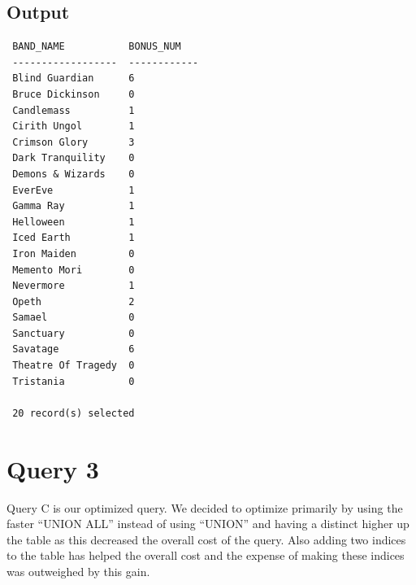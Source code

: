 \documentclass{report}
\begin{document}
\subsection*{Output}
\begin{verbatim}
 BAND_NAME           BONUS_NUM    
 ------------------  ------------ 
 Blind Guardian      6            
 Bruce Dickinson     0            
 Candlemass          1            
 Cirith Ungol        1            
 Crimson Glory       3            
 Dark Tranquility    0            
 Demons & Wizards    0            
 EverEve             1            
 Gamma Ray           1            
 Helloween           1            
 Iced Earth          1            
 Iron Maiden         0            
 Memento Mori        0            
 Nevermore           1            
 Opeth               2            
 Samael              0            
 Sanctuary           0            
 Savatage            6            
 Theatre Of Tragedy  0            
 Tristania           0            

 20 record(s) selected
\end{verbatim}

\section*{Query 3}
Query C is our optimized query. We decided to optimize primarily by
using the faster ``UNION ALL'' instead of using ``UNION'' and having a
distinct higher up the table as this decreased the overall cost of the
query. Also adding two indices to the table has helped the overall
cost and the expense of making these indices was outweighed by this
gain. 
\end{document}
